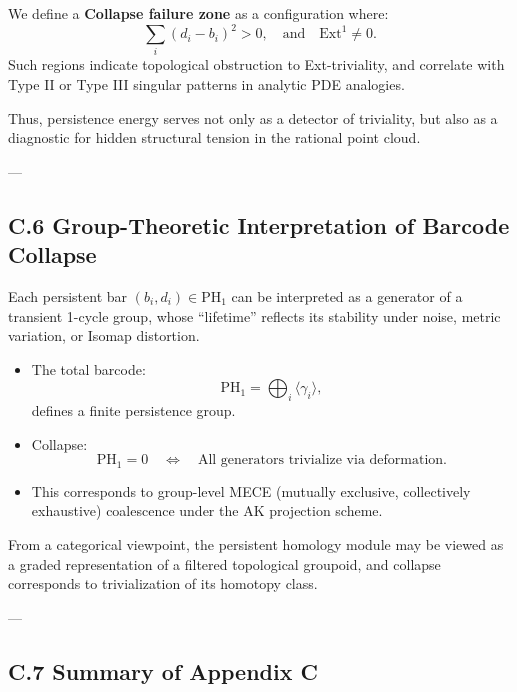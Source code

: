 \begin{definition}
We define a \textbf{Collapse failure zone} as a configuration where:
\[
\sum_i (d_i - b_i)^2 > 0,
\quad \text{and} \quad \mathrm{Ext}^1 \neq 0.
\]
Such regions indicate topological obstruction to Ext-triviality, and correlate with  
Type II or Type III singular patterns in analytic PDE analogies.
\end{definition}

Thus, persistence energy serves not only as a detector of triviality,  
but also as a diagnostic for hidden structural tension in the rational point cloud.

---

\subsection*{C.6 Group-Theoretic Interpretation of Barcode Collapse}

Each persistent bar \( (b_i, d_i) \in \mathrm{PH}_1 \) can be interpreted  
as a generator of a transient 1-cycle group, whose “lifetime” reflects its stability  
under noise, metric variation, or Isomap distortion.

\begin{itemize}
  \item The total barcode:
  \[
  \mathrm{PH}_1 = \bigoplus_i \langle \gamma_i \rangle,
  \]
  defines a finite persistence group.

  \item Collapse:
  \[
  \mathrm{PH}_1 = 0 \quad \Leftrightarrow \quad \text{All generators trivialize via deformation}.
  \]

  \item This corresponds to group-level MECE (mutually exclusive, collectively exhaustive) coalescence  
  under the AK projection scheme.
\end{itemize}

\begin{remark}
From a categorical viewpoint, the persistent homology module may be viewed  
as a graded representation of a filtered topological groupoid,  
and collapse corresponds to trivialization of its homotopy class.
\end{remark}

---

\subsection*{C.7 Summary of Appendix C}

